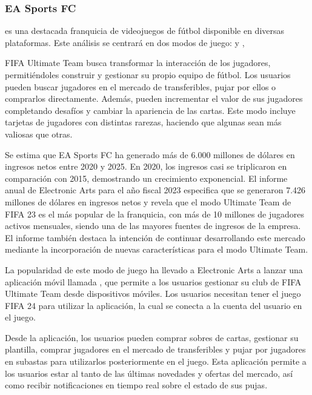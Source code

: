 \subsubsection{EA Sports FC}
 es una destacada franquicia de videojuegos de fútbol disponible en diversas plataformas. 
Este análisis se centrará en dos modos de juego:  y ,

FIFA Ultimate Team busca transformar la interacción de los jugadores, permitiéndoles construir y gestionar su propio equipo de fútbol. Los usuarios pueden buscar jugadores en el mercado de transferibles, 
pujar por ellos o comprarlos directamente. Además, pueden incrementar el valor de sus jugadores completando desafíos y cambiar la apariencia de las cartas. 
Este modo incluye tarjetas de jugadores con distintas rarezas, haciendo que algunas sean más valiosas que otras.

Se estima que EA Sports FC ha generado más de 6.000 millones de dólares en ingresos netos entre 2020 y 2025\cite{sanmartin000MillonesDolares2021}. En 2020, 
los ingresos casi se triplicaron en comparación con 2015, demostrando un crecimiento exponencial. El informe anual de Electronic Arts para el año fiscal 2023\cite{ea2023} 
especifica que se generaron 7.426 millones de dólares en ingresos netos y revela que el modo Ultimate Team de FIFA 23 es el más popular de la franquicia, con más de 10 millones 
de jugadores activos mensuales, siendo una de las mayores fuentes de ingresos de la empresa. El informe también destaca la intención de continuar desarrollando este mercado 
mediante la incorporación de nuevas características para el modo Ultimate Team.

La popularidad de este modo de juego ha llevado a Electronic Arts a lanzar una aplicación móvil llamada , 
que permite a los usuarios gestionar su club de FIFA Ultimate Team desde dispositivos móviles. Los usuarios necesitan tener el juego FIFA 24 para utilizar la aplicación, 
la cual se conecta a la cuenta del usuario en el juego. 

Desde la aplicación, los usuarios pueden comprar sobres de cartas, gestionar su plantilla, comprar jugadores en el mercado de transferibles y pujar por jugadores en subastas para utilizarlos posteriormente en el juego. 
Esta aplicación permite a los usuarios estar al tanto de las últimas novedades y ofertas del mercado, así como recibir notificaciones en tiempo real sobre el estado de sus pujas.

